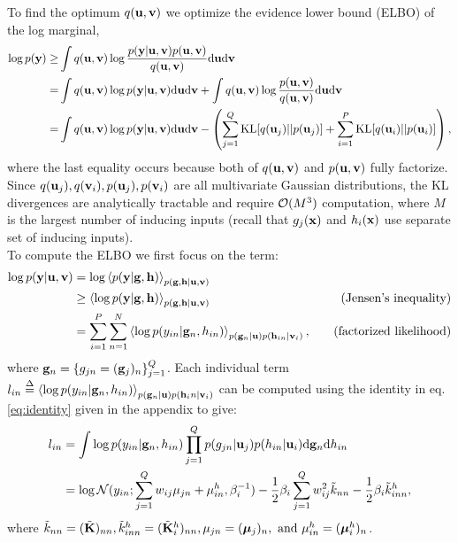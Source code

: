 \noindent
To find the optimum $q(\mathbf{u}, \mathbf{v})$ we optimize the evidence lower bound (ELBO) of the log marginal,
\begin{align}
\nonumber
\log p(\mathbf{y}) \ge& \int q(\mathbf{u}, \mathbf{v}) \log \frac{p(\mathbf{y} | \mathbf{u}, \mathbf{v}) p(\mathbf{u}, \mathbf{v})}{q(\mathbf{u}, \mathbf{v})} \mathrm{d} \mathbf{u} \mathrm{d} \mathbf{v} \\
\nonumber
=& \int q(\mathbf{u}, \mathbf{v}) \log p(\mathbf{y} | \mathbf{u}, \mathbf{v})  \mathrm{d} \mathbf{u} \mathrm{d} \mathbf{v} 
+ \int q(\mathbf{u}, \mathbf{v}) \log \frac{p(\mathbf{u}, \mathbf{v})}{q(\mathbf{u}, \mathbf{v})} \mathrm{d} \mathbf{u} \mathrm{d} \mathbf{v} \\
\label{eq:elbo}
=& \int q(\mathbf{u}, \mathbf{v}) \log p(\mathbf{y} | \mathbf{u}, \mathbf{v})  \mathrm{d} \mathbf{u} \mathrm{d} \mathbf{v} 
- \left(\sum_{j=1}^Q \text{KL}[q(\mathbf{u}_j) || p(\mathbf{u}_j)] + \sum_{i=1}^P \text{KL}[q(\mathbf{u}_i) || p(\mathbf{u}_i)] \right),
\end{align}
where the last equality occurs because both of $q(\mathbf{u}, \mathbf{v})$ and $p(\mathbf{u}, \mathbf{v})$ fully factorize.
Since $q(\mathbf{u}_j), q(\mathbf{v}_i), p(\mathbf{u}_j), p(\mathbf{v}_i)$ are all multivariate Gaussian distributions, the KL divergences are analytically tractable and require $\mathcal{O}(M^3)$ computation, where $M$ is the largest number of inducing inputs (recall that $g_j(\mathbf{x})$ and $h_i(\mathbf{x})$ use separate set of inducing inputs). \\

\noindent To compute the ELBO we first focus on the term:
\newcommand{\llangle}{\left\langle}
\newcommand{\rrangle}{\right\rangle}
\begin{align}
\nonumber
\log p(\mathbf{y} | \mathbf{u}, \mathbf{v})
 &= \log \left\langle p(\mathbf{y} | \mathbf{g}, \mathbf{h}) \right\rangle_{p(\mathbf{g},\mathbf{h} | \mathbf{u}, \mathbf{v})} \\
 \nonumber
&\ge \left\langle \log p(\mathbf{y} | \mathbf{g}, \mathbf{h}) \right\rangle_{p(\mathbf{g},\mathbf{h} | \mathbf{u}, \mathbf{v})} \quad &\text{(Jensen's inequality)} \\
&= \sum_{i=1}^P \sum_{n=1}^N \left\langle \log p(y_{in} | \mathbf{g}_n, h_{in})  \right\rangle_{p(\mathbf{g}_n | \mathbf{u}) p(\mathbf{h}_{in} | \mathbf{v}_i)}, \quad 
 &\text{(factorized likelihood)}
\end{align}
where $\mathbf{g}_n = \{g_{jn} = (\mathbf{g}_j)_n\}_{j=1}^Q$.
Each individual term $l_{in} \overset{\Delta}{=} \left\langle \log p(y_{in} | \mathbf{g}_n, h_{in})  \right\rangle_{p(\mathbf{g}_n | \mathbf{u}) p(\mathbf{h}_in | \mathbf{v}_i)}$ can be computed using the identity in eq. \ref{eq:identity} given in the appendix to give:
\begin{align}
\nonumber
l_{in} &= \int \log p(y_{in} | \mathbf{g}_n, h_{in}) \prod_{j=1}^Q p(g_{jn} | \mathbf{u}_j) p(h_{in} | \mathbf{u}_i) \mathrm{d} \mathbf{g}_n \mathrm{d} h_{in} \\
&= \log \mathcal{N}(y_{in}; \sum_{j=1}^Q w_{ij} \mu_{jn}+ \mu^h_{in}, \beta_i^{-1})
- \frac{1}{2} \beta_i \sum_{j=1}^Q w_{ij}^2 \tilde{k}_{nn} 
- \frac{1}{2} \beta_i \tilde{k}^h_{inn},
\end{align}
where $\tilde{k}_{nn} = (\tilde{\mathbf{K}})_{nn}, \tilde{k}^h_{inn} = (\tilde{\mathbf{K}}^h_i)_{nn}, \mu_{jn} = (\boldsymbol{\mu}_j)_n, \text{ and } \mu^h_{in} = (\boldsymbol{\mu}^h_i)_n$.

